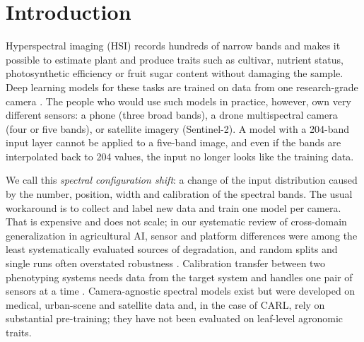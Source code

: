 \documentclass[preprint,12pt,authoryear]{elsarticle}
\begin{document}
\section{Introduction}
Hyperspectral imaging (HSI) records hundreds of narrow bands and makes it possible to estimate plant and produce
traits such as cultivar, nutrient status, photosynthetic efficiency or fruit sugar content without damaging the sample.
Deep learning models for these tasks are trained on data from one research-grade camera
\citep{laprade2024hyperleaf,varga2021ripeness}. The people who would use such models in practice, however, own
very different sensors: a phone (three broad bands), a drone multispectral camera (four or five bands), or satellite
imagery (Sentinel-2). A model with a 204-band input layer cannot be applied to a five-band image, and even if the bands
are interpolated back to 204 values, the input no longer looks like the training data.

We call this \emph{spectral configuration shift}: a change of the input distribution caused by the number, position,
width and calibration of the spectral bands. The usual workaround is to collect and label new data and train one model
per camera. That is expensive and does not scale; in our systematic review of cross-domain generalization in
agricultural AI, sensor and platform differences were among the least systematically evaluated sources of degradation,
and random splits and single runs often overstated robustness \citep{qureshi2026slr}. Calibration transfer between two
phenotyping systems needs data from the target system and handles one pair of sensors at a time
\citep{rehman2022calibration}. Camera-agnostic spectral models exist \citep{varga2023hyve,baumann2025carl} but were
developed on medical, urban-scene and satellite data and, in the case of CARL, rely on substantial pre-training; they
have not been evaluated on leaf-level agronomic traits.
\end{document}
